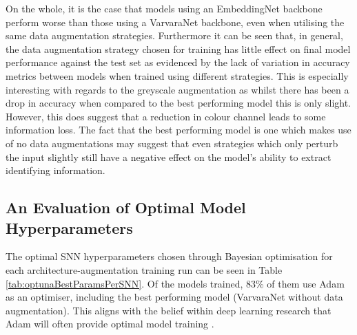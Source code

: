 On the whole, it is the case that models using an EmbeddingNet backbone perform worse than those using a VarvaraNet backbone, even when utilising the same data augmentation strategies. Furthermore it can be seen that, in general, the data augmentation strategy chosen for training has little effect on final model performance against the test set as evidenced by the lack of variation in accuracy metrics between models when trained using different strategies. This is especially interesting with regards to the greyscale augmentation as whilst there has been a drop in accuracy when compared to the best performing model this is only slight. However, this does suggest that a reduction in colour channel leads to some information loss. The fact that the best performing model is one which makes use of no data augmentations may suggest that even strategies which only perturb the input slightly still have a negative effect on the model's ability to extract identifying information. 

\subsection{An Evaluation of Optimal Model Hyperparameters}\label{ch:ID,sec:ModelSelection,subsec:paramEval}

The optimal SNN hyperparameters chosen through Bayesian optimisation for each architecture-augmentation training run can be seen in Table \ref{tab:optunaBestParamsPerSNN}. Of the models trained, 83\% of them use Adam \cite{kingma_adam:_2014} as an optimiser, including the best performing model (VarvaraNet without data augmentation). This aligns with the belief within deep learning research that Adam will often provide optimal model training \cite{karpathy_peek_2017}.

